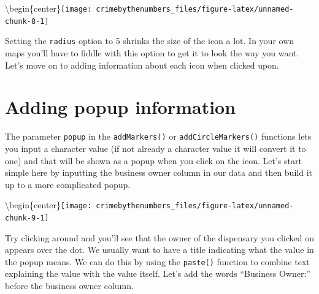 \documentclass[
]{krantz}
\makeatletter
\newenvironment{Shaded}{\begin{snugshade}}{\end{snugshade}}
\newcommand{\AttributeTok}[1]{\textcolor[rgb]{0.61,0.61,0.61}{#1}}
\newcommand{\DecValTok}[1]{\textcolor[rgb]{0.06,0.06,0.06}{#1}}
\newcommand{\FunctionTok}[1]{\textcolor[rgb]{0,0,0}{#1}}
\newcommand{\NormalTok}[1]{#1}
\newcommand{\SpecialCharTok}[1]{\textcolor[rgb]{0,0,0}{#1}}
\newcommand{\StringTok}[1]{\textcolor[rgb]{0.5,0.5,0.5}{#1}}
\newenvironment{kframe}{%
\medskip{}
\setlength{\fboxsep}{.8em}
 \def\at@end@of@kframe{}%
 \ifinner\ifhmode%
  \def\at@end@of@kframe{\end{minipage}}%
  \begin{minipage}{\columnwidth}%
 \fi\fi%
 \def\FrameCommand##1{\hskip\@totalleftmargin \hskip-\fboxsep
 \colorbox{shadecolor}{##1}\hskip-\fboxsep
     \hskip-\linewidth \hskip-\@totalleftmargin \hskip\columnwidth}%
 \MakeFramed {\advance\hsize-\width
   \@totalleftmargin\z@ \linewidth\hsize
   \@setminipage}}%
 {\par\unskip\endMakeFramed%
 \at@end@of@kframe}
\renewenvironment{Shaded}{\begin{kframe}}{\end{kframe}}
\makeatother
\begin{document}
\textbackslash begin\{center\}\texttt{[image: crimebythenumbers\_files/figure-latex/unnamed-chunk-8-1]}

Setting the \texttt{radius} option to 5 shrinks the size of the icon a lot. In your own maps you'll have to fiddle with this option to get it to look the way you want. Let's move on to adding information about each icon when clicked upon.

\hypertarget{adding-popup-information}{%
\section{Adding popup information}\label{adding-popup-information}}

The parameter \texttt{popup} in the \texttt{addMarkers()} or \texttt{addCircleMarkers()} functions lets you input a character value (if not already a character value it will convert it to one) and that will be shown as a popup when you click on the icon. Let's start simple here by inputting the business owner column in our data and then build it up to a more complicated popup.

\begin{Shaded}
\end{Shaded}

\textbackslash begin\{center\}\texttt{[image: crimebythenumbers\_files/figure-latex/unnamed-chunk-9-1]}

Try clicking around and you'll see that the owner of the dispensary you clicked on appears over the dot. We usually want to have a title indicating what the value in the popup means. We can do this by using the \texttt{paste()} function to combine text explaining the value with the value itself. Let's add the words ``Business Owner:'' before the business owner column.
\end{document}
